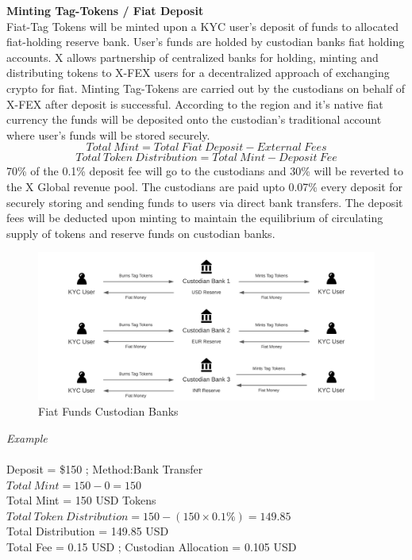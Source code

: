\documentclass[letterpaper,11pt]{article}
\begin{document}
\textbf{Minting Tag-Tokens / Fiat Deposit}\\
Fiat-Tag Tokens will be minted upon a KYC user's deposit of funds to allocated fiat-holding reserve bank. User's funds are holded by custodian banks fiat holding accounts. X allows partnership of centralized banks for holding, minting and distributing tokens to X-FEX users for a decentralized approach of exchanging crypto for fiat. Minting Tag-Tokens are carried out by the  custodians on behalf of X-FEX after deposit is successful. According to the region and it's native fiat currency the funds will be deposited onto the custodian's traditional account where user's funds will be stored securely.\\
\[Total\:Mint=Total\:Fiat\:Deposit-External\:Fees\]
\[Total\:Token\:Distribution=Total\:Mint-Deposit\:Fee\]
70\% of the 0.1\% deposit fee will go to the custodians and 30\% will be reverted to the X Global revenue pool. The custodians are paid upto 0.07\% every deposit for securely storing and sending funds to users via direct bank transfers. The deposit fees will be deducted upon minting to maintain the equilibrium of circulating supply of tokens and reserve funds on custodian banks.\\

\begin{figure}
\begin{center}
\includegraphics[width=12cm]{custodian}
\caption{Fiat Funds Custodian Banks}
\end{center}
\end{figure}

\textit{Example}\\\\
Deposit = \$150 ; Method:Bank Transfer\\
$Total\:Mint=150-0 = 150$\\
Total Mint = 150 USD Tokens\\
$Total\:Token\:Distribution=150-(150 \times 0.1\%)=149.85$\\
Total Distribution = 149.85 USD\\
Total Fee = 0.15 USD ; Custodian Allocation = 0.105 USD\\
\end{document}
